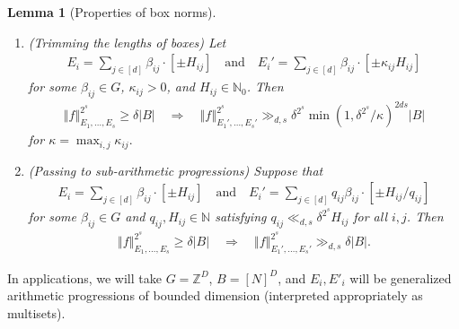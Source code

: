 \documentclass[11pt]{amsart}
\newtheorem{lemma}{Lemma}[section]
\theoremstyle{definition}
\newcommand{\N}{{\mathbb N}}
\newcommand{\Z}{{\mathbb Z}}
\newcommand{\norm}[1]{\left\Vert #1\right\Vert}
\begin{document}
\begin{lemma}[Properties of box norms]
\begin{enumerate}
\begin{align*}
        E_i = \sum_{j\in [d_i]}\beta_{ij}\cdot[\pm H_{ij}]\quad \textrm{and}\quad E_i' = \sum_{j\in [d'_i]}\beta_{ij}\cdot[\pm H_{ij}]
    \end{align*}
    for some $\beta_{ij}\in G$ and $H_{ij}\in\N_0$. Then
    \begin{align*}
        \norm{f}_{E_1, \ldots, E_s}^{2^s}\geq \delta |B|\quad\Longrightarrow \quad \norm{f}_{E_1', \ldots, E_s'}^{2^s}\geq \delta^{2^s}|B|.
    \end{align*}
    \item\label{i: trimming 2} (Trimming the lengths of boxes) Let
    \begin{align*}%
        E_i = \sum_{j\in [d]}\beta_{ij}\cdot[\pm H_{ij}]\quad \textrm{and}\quad E_i' = \sum_{j\in [d]}\beta_{ij}\cdot[\pm \kappa_{ij} H_{ij}]
    \end{align*}
    for some $\beta_{ij}\in G$, $\kappa_{ij}>0$, and $H_{ij}\in \N_0$. Then
    \begin{align*}
        \norm{f}_{E_1, \ldots, E_s}^{2^s}\geq \delta |B|\quad \Longrightarrow\quad        \norm{f}_{E_1', \ldots, E_s'}^{2^s}\gg_{d,s}\delta^{2^s}\min(1, \delta^{2^s}/\kappa)^{2ds}|B|
    \end{align*}
    for $\kappa = \max_{i,j}\kappa_{ij}.$
    \item\label{i: passing to APs} (Passing to sub-arithmetic progressions)
    Suppose that 
    \begin{align*}%
        E_i = \sum_{j\in [d]}\beta_{ij}\cdot[\pm H_{ij}]\quad \textrm{and}\quad E_i' = \sum_{j\in [d]}q_{ij}\beta_{ij}\cdot[\pm H_{ij}/q_{ij}]
    \end{align*}
    for some $\beta_{ij}\in G$ and $q_{ij}, H_{ij}\in\N$ satisfying $q_{ij}\ll_{d,s}\delta^{2^s}H_{ij}$ for all $i,j$. 
    Then
    \begin{align*}
        \norm{f}_{E_1, \ldots, E_s}^{2^s}\geq \delta |B|\quad \Longrightarrow\quad        \norm{f}_{E_1', \ldots, E_s'}^{2^s}\gg_{d,s} \delta|B|.
    \end{align*}
\end{enumerate}
\end{lemma}
In applications, we will take $G = \Z^D$, $B = [N]^D$, and $E_i, E'_i$ will be generalized arithmetic progressions of bounded dimension (interpreted appropriately as multisets). 
\end{document}
